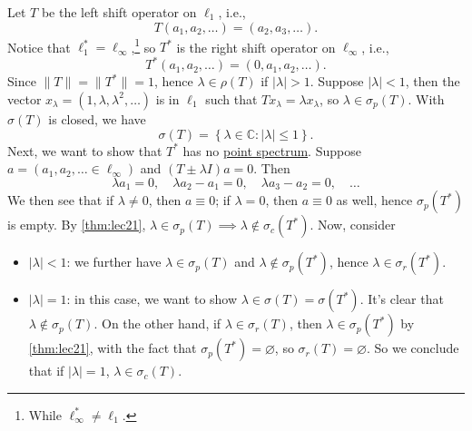 \begin{eg}
	Let \(T\) be the left shift operator on \(\ell _1\), i.e.,
	\[
		T(a_1, a_2, \ldots  )= (a_2, a_3, \ldots  ).
	\]
	Notice that \(\ell _1^{\ast} = \ell _\infty \),\footnote{While \(\ell ^{\ast} _\infty \neq \ell _1\).} so \(T^{\ast} \) is the right shift operator on \(\ell _\infty \), i.e.,
	\[
		T^{\ast} (a_1, a_2, \ldots  ) = (0, a_1, a_2, \ldots  ).
	\]
	Since \(\lVert T \rVert = \lVert T^{\ast}  \rVert = 1\), hence \(\lambda \in \rho (T)\) if \(\vert \lambda  \vert > 1\). Suppose \(\vert \lambda  \vert < 1\), then the vector \(x_\lambda = (1, \lambda , \lambda ^{2} , \ldots  )\) is in \(\ell _1\) such that \(Tx_\lambda = \lambda x_\lambda \), so \(\lambda \in \sigma _p(T)\). With \(\sigma (T)\) is closed, we have
	\[
		\sigma (T) = \left\{ \lambda \in \mathbb{C} \colon \vert \lambda  \vert \leq 1 \right\} .
	\]
	Next, we want to show that \(T^{\ast} \) has no \hyperref[def:point-spectrum]{point spectrum}. Suppose \(a=(a_1, a_2, \ldots  \in \ell _\infty )\) and \((T\pm \lambda I)a=0\). Then
	\[
		\lambda a_1 = 0,\quad
		\lambda a_2 - a_1 = 0,\quad
		\lambda a_3 - a_2 = 0,\quad \ldots
	\]
	We then see that if \(\lambda \neq 0\), then \(a\equiv 0\); if \(\lambda = 0\), then \(a\equiv 0\) as well, hence \(\sigma _p(T^{\ast} )\) is empty. By \autoref{thm:lec21}, \(\lambda \in \sigma _p(T) \implies \lambda \notin \sigma _c(T^{\ast} )\). Now, consider
	\begin{itemize}
		\item \(\vert \lambda  \vert < 1\): we further have \(\lambda \in \sigma _p(T)\) and \(\lambda \notin \sigma _p(T^{\ast} )\), hence \(\lambda \in \sigma _r(T^{\ast} )\).
		\item \(\vert \lambda  \vert = 1\): in this case, we want to show \(\lambda \in \sigma (T) = \sigma (T^{\ast} )\). It's clear that \(\lambda \notin \sigma _p(T)\). On the other hand, if \(\lambda \in \sigma _r(T)\), then \(\lambda \in \sigma _p(T^{\ast} )\) by \autoref{thm:lec21}, with the fact that \(\sigma _p(T^{\ast} ) = \varnothing \), so \(\sigma _r(T) = \varnothing \). So we conclude that if \(\vert \lambda \vert = 1\), \(\lambda \in \sigma _c(T)\).


\end{itemize}
\end{eg}
